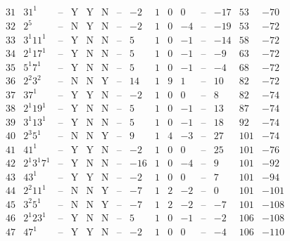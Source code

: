 \documentclass[11pt,reqno,a4letter]{article}
\numberwithin{figure}{section}
\numberwithin{table}{section}
\theoremstyle{plain}
\numberwithin{theorem}{section}
\theoremstyle{definition}
\begin{document}
\begin{table}[h!]
\begin{equation*}
{\begin{array}{|cc|c|ccc|c|c|ccc|c|ccc}
 31 & 31^1 & \text{--} & \text{Y} & \text{Y} & \text{N} & \text{--} & -2 & 1 & 0 & 0 & \text{--} & -17 & 53 & -70 \\
 32 & 2^5 & \text{--} & \text{N} & \text{Y} & \text{N} & \text{--} & -2 & 1 & 0 & -4 & \text{--} & -19 & 53 & -72 \\
 33 & 3^1 11^1 & \text{--} & \text{Y} & \text{N} & \text{N} & \text{--} & 5 & 1 & 0 & -1 & \text{--} & -14 & 58 & -72 \\
 34 & 2^1 17^1 & \text{--} & \text{Y} & \text{N} & \text{N} & \text{--} & 5 & 1 & 0 & -1 & \text{--} & -9 & 63 & -72 \\
 35 & 5^1 7^1 & \text{--} & \text{Y} & \text{N} & \text{N} & \text{--} & 5 & 1 & 0 & -1 & \text{--} & -4 & 68 & -72 \\
 36 & 2^2 3^2 & \text{--} & \text{N} & \text{N} & \text{Y} & \text{--} & 14 & 1 & 9 & 1 & \text{--} & 10 & 82 & -72 \\
 37 & 37^1 & \text{--} & \text{Y} & \text{Y} & \text{N} & \text{--} & -2 & 1 & 0 & 0 & \text{--} & 8 & 82 & -74 \\
 38 & 2^1 19^1 & \text{--} & \text{Y} & \text{N} & \text{N} & \text{--} & 5 & 1 & 0 & -1 & \text{--} & 13 & 87 & -74 \\
 39 & 3^1 13^1 & \text{--} & \text{Y} & \text{N} & \text{N} & \text{--} & 5 & 1 & 0 & -1 & \text{--} & 18 & 92 & -74 \\
 40 & 2^3 5^1 & \text{--} & \text{N} & \text{N} & \text{Y} & \text{--} & 9 & 1 & 4 & -3 & \text{--} & 27 & 101 & -74 \\
 41 & 41^1 & \text{--} & \text{Y} & \text{Y} & \text{N} & \text{--} & -2 & 1 & 0 & 0 & \text{--} & 25 & 101 & -76 \\
 42 & 2^1 3^1 7^1 & \text{--} & \text{Y} & \text{N} & \text{N} & \text{--} & -16 & 1 & 0 & -4 & \text{--} & 9 & 101 & -92 \\
 43 & 43^1 & \text{--} & \text{Y} & \text{Y} & \text{N} & \text{--} & -2 & 1 & 0 & 0 & \text{--} & 7 & 101 & -94 \\
 44 & 2^2 11^1 & \text{--} & \text{N} & \text{N} & \text{Y} & \text{--} & -7 & 1 & 2 & -2 & \text{--} & 0 & 101 & -101 \\
 45 & 3^2 5^1 & \text{--} & \text{N} & \text{N} & \text{Y} & \text{--} & -7 & 1 & 2 & -2 & \text{--} & -7 & 101 & -108 \\
 46 & 2^1 23^1 & \text{--} & \text{Y} & \text{N} & \text{N} & \text{--} & 5 & 1 & 0 & -1 & \text{--} & -2 & 106 & -108 \\
 47 & 47^1 & \text{--} & \text{Y} & \text{Y} & \text{N} & \text{--} & -2 & 1 & 0 & 0 & \text{--} & -4 & 106 & -110 \\

\end{array}}
\end{equation*}
\end{table}
\end{document}
